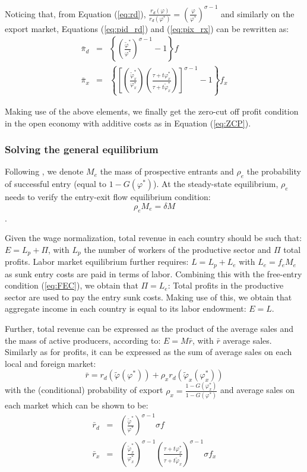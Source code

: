 \documentclass[a4paper,11pt]{article}
\begin{document}
Noticing that, from Equation (\ref{eq:rd}), $\frac{r_d(\varphi)}{r_d(\varphi^\ast)} = \left( \frac{\varphi}{\varphi^\ast} \right)^{\sigma-1}$ and similarly on the export market, Equations (\ref{eq:pid_rd}) and (\ref{eq:pix_rx}) can be rewritten as:
\begin{eqnarray*}
\bar{\pi}_d &=& \left\{\left(\frac{\widetilde{\varphi}^\ast}{\varphi^\ast}\right)^{\sigma-1}-1 \right\}f \\
\bar{\pi}_x &=& \left\{\left[\left(\frac{\widetilde{\varphi}_x^\ast}{\varphi_x^\ast}\right)\left(\frac{\tau+ t \varphi^\ast_x}{\tau+ t \widetilde{\varphi}^\ast_x}\right)\right]^{\sigma-1}-1 \right\}f_x
\end{eqnarray*}

Making use of the above elements, we finally get the zero-cut off profit condition in the open economy with additive costs as in Equation (\ref{eq:ZCP}).


\subsubsection{Solving the general equilibrium}

Following \cite{melitz}, we denote $M_e$ the mass of prospective entrants and $\rho_e$ the probability of successful entry (equal to $1-G(\varphi^\ast)$). At the steady-state equilibrium, $\rho_e$ needs to verify the entry-exit flow equilibrium condition:
$$\rho_e M_e = \delta M$$.

Given the wage normalization, total revenue in each country should be such that: $E = L_p+\Pi$, with $L_p$ the number of workers of the productive sector and $\Pi$ total profits. Labor market equilibrium further requires: $L = L_p+ L_e$ with $L_e = f_eM_e$ as sunk entry costs are paid in terms of labor. Combining this with the free-entry condition (\ref{eq:FEC}), we obtain that $\Pi = L_e$: Total profits in the productive sector are used to pay the entry sunk costs. Making use of this, we obtain that aggregate income in each country is equal to its labor endowment: $E =L$.

Further, total revenue can be expressed as the product of the average sales and the mass of active producers, according to: $E = M\bar{r}$, with $\bar{r}$ average sales. Similarly as for profits, it can be expressed as the sum of average sales on each local and foreign market:
$$\bar{r} = r_d(\widetilde{\varphi}(\varphi^\ast))+ \rho_x r_d(\widetilde{\varphi}_x(\varphi_x^\ast))$$
\noindent with the (conditional) probability of export $\rho_x = \frac{1-G(\varphi^\ast_x)}{1-G(\varphi^\ast)}$ and average sales on each market which can be shown to be:
\begin{eqnarray*}
\bar{r}_d &=& \left(\frac{\widetilde{\varphi}^\ast}{\varphi^\ast}\right)^{\sigma-1} \sigma f \\
\bar{r}_x &=& \left(\frac{\widetilde{\varphi}_x^\ast}{\varphi_x^\ast}\right)^{\sigma-1}\left(\frac{\tau+ t \varphi^\ast_x}{\tau+ t \widetilde{\varphi}^\ast_x}\right)^{\sigma-1} \sigma f_x
\end{eqnarray*}
\end{document}
